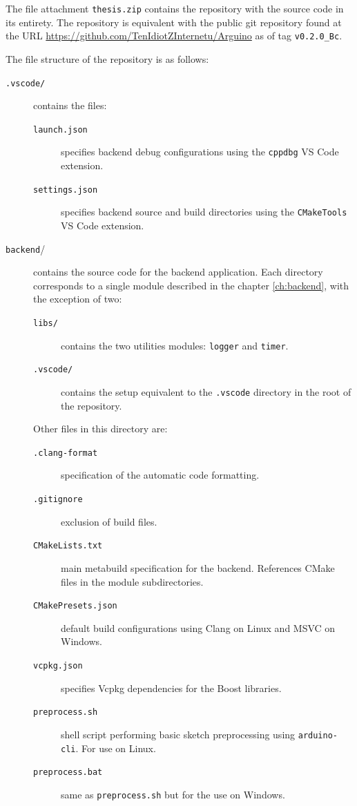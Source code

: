 \documentclass[12pt,a4paper]{report}
\begin{document}
The file attachment \texttt{thesis.zip} contains the repository with the source code in its entirety. The repository is equivalent with the public git repository found at the URL \url{https://github.com/TenIdiotZInternetu/Arguino} as of tag \texttt{v0.2.0\_Bc}.

The file structure of the repository is as follows:
\begin{description}
	\item[\texttt{.vscode/}] contains the files:
		\begin{description}
			\item[\texttt{launch.json}] specifies backend debug configurations using the \texttt{cppdbg} VS Code extension.
			\item[\texttt{settings.json}] specifies backend source and build directories using the \texttt{CMakeTools} VS Code extension.
		\end{description}
	\item[\texttt{backend}/] contains the source code for the backend application. Each directory corresponds to a single module described in the chapter \ref{ch:backend}, with the exception of two:
		\begin{description}
			\item[\texttt{libs/}] contains the two utilities modules: \texttt{logger} and \texttt{timer}.
			\item[\texttt{.vscode/}] contains the setup equivalent to the \texttt{.vscode} directory in the root of the repository. 
		\end{description}
		Other files in this directory are:
		\begin{description}
			\item[\texttt{.clang-format}] specification of the automatic code formatting.
			\item[\texttt{.gitignore}] exclusion of build files.
			\item[\texttt{CMakeLists.txt}] main metabuild specification for the backend. References CMake files in the module subdirectories.
			\item[\texttt{CMakePresets.json}] default build configurations using Clang on Linux and MSVC on Windows.
			\item[\texttt{vcpkg.json}] specifies Vcpkg dependencies for the Boost libraries.
			\item[\texttt{preprocess.sh}] shell script performing basic sketch preprocessing using \texttt{arduino-cli}. For use on Linux.
			\item[\texttt{preprocess.bat}] same as \texttt{preprocess.sh} but for the use on Windows. 

\end{description}
\end{description}
\end{document}
